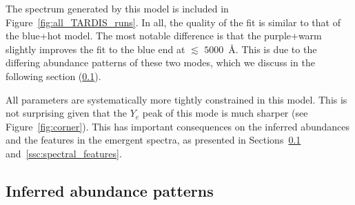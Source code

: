 \documentclass[twocolumn, twocolappendix]{aastex63}
\begin{document}
The spectrum generated by this model is included in Figure~\ref{fig:all_TARDIS_runs}. In all, the quality of the fit is similar to that of the blue+hot model. The most notable difference is that the purple+warm slightly improves the fit to the blue end at $\lesssim$ $5000$~\AA. This is due to the differing abundance patterns of these two modes, which we discuss in the following section (\ref{ssc:bestfit-abunds}).

All parameters are systematically more tightly constrained in this model. This is not surprising given that the $Y_e$ peak of this mode is much sharper (see Figure~\ref{fig:corner}). This has important consequences on the inferred abundances and the features in the emergent spectra, as presented in Sections~\ref{ssc:bestfit-abunds} and~\ref{ssc:spectral_features}.


\subsection{Inferred abundance patterns}\label{ssc:bestfit-abunds}
\end{document}
